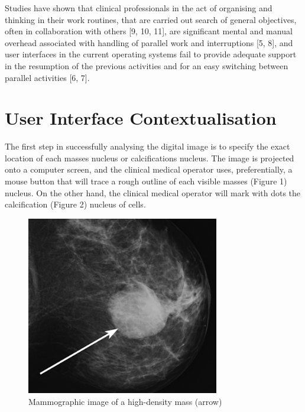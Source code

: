 Studies have shown that clinical professionals in the act of organising and thinking in their work routines, that are carried out search of general objectives, often in collaboration with others [9, 10, 11], are significant mental and manual overhead associated with handling of parallel work and interruptions [5, 8], and user interfaces in the current operating systems fail to provide adequate support in the resumption of the previous activities and for an easy switching between parallel activities [6, 7].

\section{User Interface Contextualisation}

The first step in successfully analysing the digital image is to specify the exact location of each masses nucleus or calcifications nucleus. The image is projected onto a computer screen, and the clinical medical operator uses, preferentially, a mouse button that will trace a rough outline of each visible masses (Figure 1) nucleus. On the other hand, the clinical medical operator will mark with dots the calcification (Figure 2) nucleus of cells.

\begin{figure}[!hbt]
\centering
\includegraphics[width=0.75\textwidth]{masses.png}
\caption{\label{fig:frog}Mammographic image of a high-density mass (arrow)
}
\end{figure}

